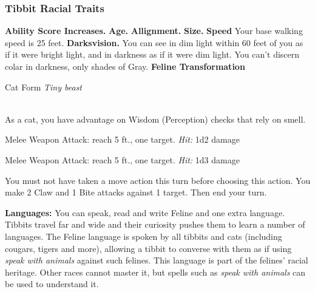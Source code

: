 \subsubsection{Tibbit Racial Traits}
\textbf{Ability Score Increases.}
\textbf{Age.}
\textbf{Allignment.}
\textbf{Size.}
\textbf{Speed} Your base walking speed is 25 feet.
\textbf{Darksvision.} You can see in dim light within 60 feet of you as if it were bright light, and in darkness as if it were dim light. You can't discern colar in darkness, only shades of Gray. 
\textbf{Feline Transformation}


\begin{monsterbox}{Cat Form}
	\textit{Tiny beast}\\
	\hline
	\basics[%
	armorclass = As normal but note extra dex from cat form,
	hitpoints  = -,
	speed      = {40 ft, climb 30 ft}
	]
	\hline
	\stats[
	STR = -8 (Minimum 3),
	DEX = +2,
	CON = -,
	INT = -,
	WIS = -,
	CHA = -
	]
	\hline
	\details[
	skills = {Perception + 3, Stealth + 4},
	languages = {Only Feline},
	challenge = -
	]
	\hline \\[1mm]
	\begin{monsteraction}
		As a cat, you have advantage on Wisdom (Perception) checks that rely on smell.
	\end{monsteraction}
	\begin{monsteraction}[Claws]
		Melee Weapon Attack: reach 5 ft., one target.
		\textit{Hit:} 1d2 damage
	\end{monsteraction}

\begin{monsteraction}[Bite]
		Melee Weapon Attack: reach 5 ft., one target.
		\textit{Hit:} 1d3 damage
	\end{monsteraction}

	\begin{monsteraction}[Frenzy]
    You must not have taken a move action this turn before choosing this action. You make 2 Claw and 1 Bite attacks against 1 target. Then end your turn.
	\end{monsteraction}
\end{monsterbox}

\textbf{Languages:} You can speak, read and write Feline and one extra language. Tibbits travel far and wide and their curiosity pushes them to learn a number of languages. The Feline language is spoken by all tibbits and cats (including cougars, tigers and more), allowing a tibbit to converse with them as if using \textit{speak with animals} against such felines. This language is part of the felines' racial heritage. Other races cannot master it, but spells such as \textit{speak with animals} can be used to understand it.
  